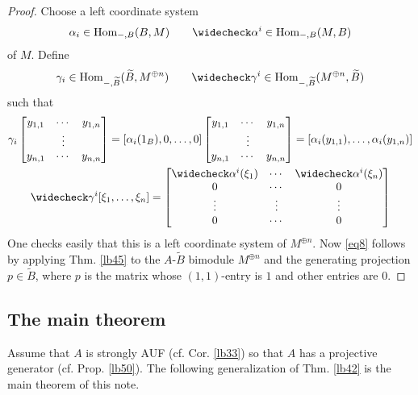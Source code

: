 \documentclass[11pt,b5paper,notitlepage]{article}
\theoremstyle{definition}
\theoremstyle{plain}
\newcommand{\wtd}{\widetilde}
\newcommand{\wch}{\widecheck}
\newcommand{\Hom}{\mathrm{Hom}}
\numberwithin{equation}{section}
\begin{document}
\begin{proof}
Choose a left coordinate system
\begin{gather*}
\alpha_i\in\Hom_{-,B}(B,M)\qquad \wch\alpha^i\in \Hom_{-,B}(M,B)
\end{gather*}
of $M$. Define
\begin{gather*}
\gamma_i\in\Hom_{-,\wtd B}(\wtd B,M^{\oplus n})\qquad \wch\gamma^i\in\Hom_{-,\wtd B}(M^{\oplus n},\wtd B)
\end{gather*}
such that
\begin{gather*}
\gamma_i
\begin{bmatrix}
y_{1,1}&\cdots&y_{1,n}\\
&\vdots&\\
y_{n,1}&\cdots&y_{n,n}
\end{bmatrix}
=[\alpha_i(1_B),0,\dots,0]\begin{bmatrix}
y_{1,1}&\cdots&y_{1,n}\\
&\vdots&\\
y_{n,1}&\cdots&y_{n,n}
\end{bmatrix}=[\alpha_i(y_{1,1}),\dots,\alpha_i(y_{1,n})]
\\
\wch\gamma^i[\xi_1,\dots,\xi_n]
=
\begin{bmatrix}
\wch\alpha^i(\xi_1)&\cdots&\wch\alpha^i(\xi_n)\\
0&\cdots&0\\
\vdots&\vdots&\vdots\\
0&\cdots&0
\end{bmatrix}
\end{gather*}
One checks easily that this is a left coordinate system of $M^{\oplus n}$. Now \eqref{eq8} follows by applying Thm. \ref{lb45} to the $A$-$\wtd B$ bimodule $M^{\oplus n}$ and the generating projection $p\in\wtd B$, where $p$ is the matrix whose $(1,1)$-entry is $1$ and other entries are $0$. 
\end{proof}




\subsection{The main theorem}


Assume that $A$ is strongly AUF (cf. Cor. \ref{lb33}) so that $A$ has a projective generator (cf. Prop. \ref{lb50}). The following generalization of Thm. \ref{lb42} is the main theorem of this note.
\end{document}
